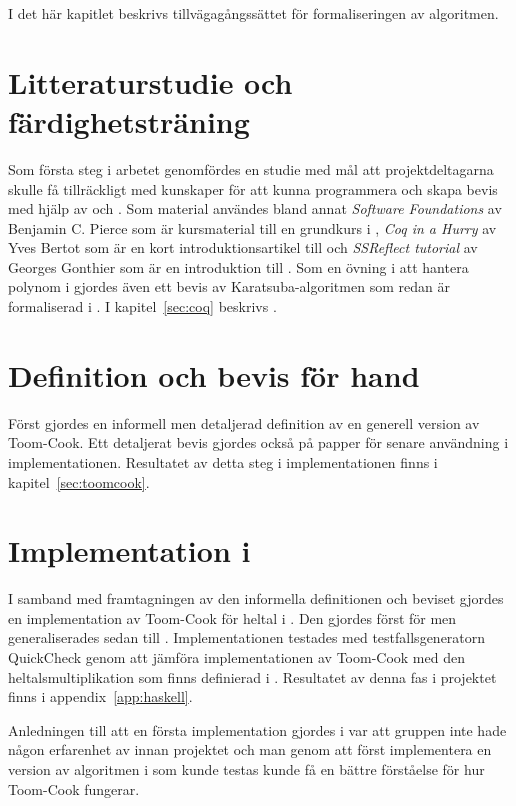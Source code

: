 I det här kapitlet beskrivs tillvägagångssättet för formaliseringen av algoritmen.

\section{Litteraturstudie och färdighetsträning}
Som första steg i arbetet genomfördes en studie med mål att projektdeltagarna
skulle få tillräckligt med kunskaper för att kunna programmera och skapa bevis
med hjälp av \coq{} och \ssr{}. Som material användes bland annat
\emph{Software Foundations} av Benjamin C. Pierce som är kursmaterial till en
grundkurs i \coq{}\cite{pierce2012software}, \emph{Coq in a Hurry} av Yves
Bertot som är en kort introduktionsartikel till \coq{}\cite{bertot2006coq} och
\emph{SSReflect tutorial} av Georges Gonthier som är en introduktion till
\ssr{} \cite{gonthier2009ssreflect}. Som en övning i att hantera polynom i \ssr
gjordes även ett bevis av Karatsuba-algoritmen som redan är formaliserad i
\coq{}. I kapitel~\ref{sec:coq} beskrivs \coq.

\section{Definition och bevis för hand}
Först gjordes en informell men detaljerad definition av en generell version av
Toom-Cook. Ett detaljerat bevis gjordes också på papper för senare användning i
implementationen. Resultatet av detta steg i implementationen finns i
kapitel~\ref{sec:toomcook}.

\section{Implementation i \haskell{}}
I samband med framtagningen av den informella definitionen och beviset gjordes
en implementation av Toom-Cook för heltal i \haskell{}. Den gjordes först för
 men generaliserades sedan till . Implementationen testades
med testfallsgeneratorn QuickCheck genom att jämföra implementationen av
Toom-Cook med den heltalsmultiplikation som finns definierad i \haskell{}.
Resultatet av denna fas i projektet finns i appendix~\ref{app:haskell}.

Anledningen till att en första implementation gjordes i \haskell{} var att
gruppen inte hade någon erfarenhet av \coq{} innan projektet och man genom att
först implementera en version av algoritmen i \haskell{} som kunde testas
kunde få en bättre förståelse för hur Toom-Cook fungerar.

